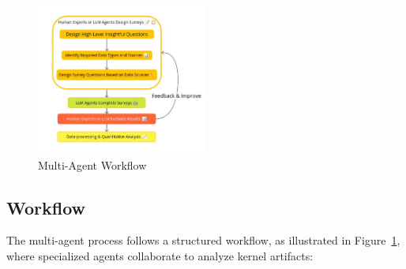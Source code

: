 \begin{figure}[t]
    \centering
    \includegraphics[width=0.5\textwidth]{workflow.pdf}
    \caption{\sys Multi-Agent Workflow}
    \label{fig:workflow}
\end{figure}

\subsection{Workflow}

The \sys multi-agent process follows a structured workflow, as illustrated in Figure~\ref{fig:workflow}, where specialized agents collaborate to analyze kernel artifacts:

